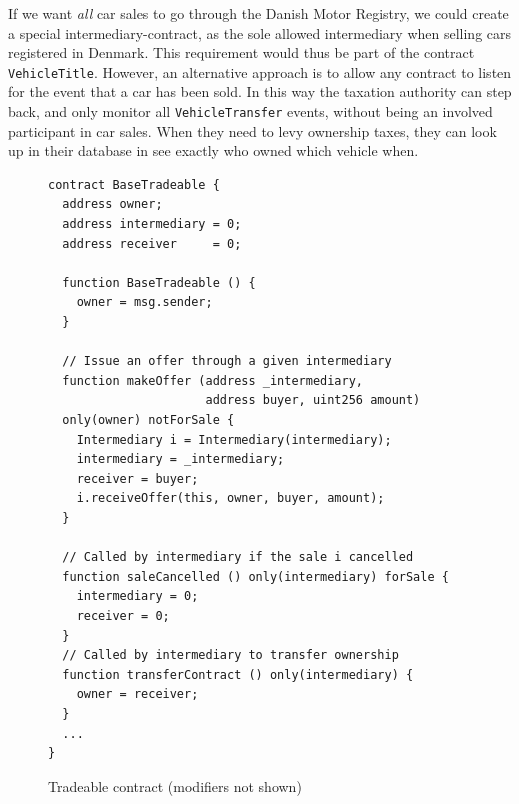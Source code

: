 \documentclass[oneside,a4paper,10pts,article]{memoir}
\begin{document}
If we want \emph{all} car sales to go through the Danish Motor
Registry, we could create a special intermediary-contract, as the sole
allowed intermediary when selling cars registered in Denmark. This
requirement would thus be part of the contract
\texttt{VehicleTitle}. However, an alternative approach is to allow
any contract to listen for the event that a car has been sold. In this
way the taxation authority can step back, and only monitor all
\texttt{VehicleTransfer} events, without being an involved participant
in car sales. When they need to levy ownership taxes, they can look up
in their database in see exactly who owned which vehicle when.

\begin{figure}
\begin{lstlisting}
contract BaseTradeable {
  address owner;
  address intermediary = 0;
  address receiver     = 0;

  function BaseTradeable () {
    owner = msg.sender;
  }

  // Issue an offer through a given intermediary  
  function makeOffer (address _intermediary,
                      address buyer, uint256 amount)
  only(owner) notForSale {
    Intermediary i = Intermediary(intermediary);
    intermediary = _intermediary;
    receiver = buyer;
    i.receiveOffer(this, owner, buyer, amount);
  }

  // Called by intermediary if the sale i cancelled
  function saleCancelled () only(intermediary) forSale {
    intermediary = 0;
    receiver = 0;
  }
  // Called by intermediary to transfer ownership
  function transferContract () only(intermediary) {
    owner = receiver;
  }
  ...
}
\end{lstlisting}

\caption{Tradeable contract (modifiers not shown)}
\label{fig:tradeable}
\end{figure}
\end{document}
